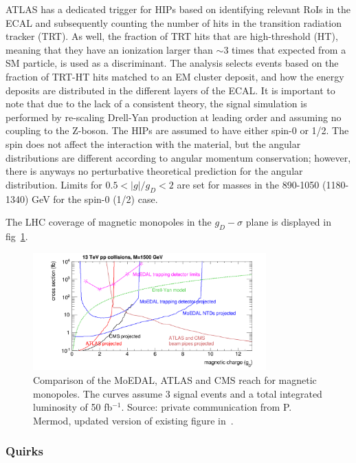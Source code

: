 ATLAS has a dedicated trigger for HIPs based on identifying relevant RoIs in the ECAL and subsequently counting the number of hits in the transition radiation tracker (TRT). As well, the fraction of TRT hits that are high-threshold (HT), meaning that they have an ionization larger than $\sim3$ times that expected from a SM particle, is used as a discriminant. The analysis selects events based on the fraction of TRT-HT hits matched to an EM cluster deposit, and how the energy deposits are distributed in the different layers of the ECAL. It is important to note that due to the lack of a consistent theory, the signal simulation is performed by re-scaling Drell-Yan production at leading order and assuming no coupling to the Z-boson. The HIPs are assumed to have either spin-0 or 1/2. The spin does not affect the interaction with the material, but the angular distributions are different according to angular momentum conservation; however, there is anyways no perturbative theoretical prediction for the angular distribution. Limits for $0.5 < |g|/g_D < 2$ are set for masses in the 890-1050 (1180-1340) GeV for the spin-0 (1/2) case.

The LHC coverage of magnetic monopoles in the $g_D-\sigma$ plane is displayed in fig~\ref{fig:magnetic_monopole_reach}.
\begin{figure}[htb]
\centering
\includegraphics[width=0.8\textwidth]{plots/monopoles_xsec_13TeV_3events}
\caption{Comparison of the MoEDAL, ATLAS and CMS reach for magnetic monopoles. The curves assume 3 signal events and a total integrated luminosity of 50 fb$^{-1}$. Source: private communication from P. Mermod, updated version of existing figure in~\cite{DeRoeck:2011aa}.}
\label{fig:magnetic_monopole_reach}
\end{figure}

\subsubsection{Quirks}

